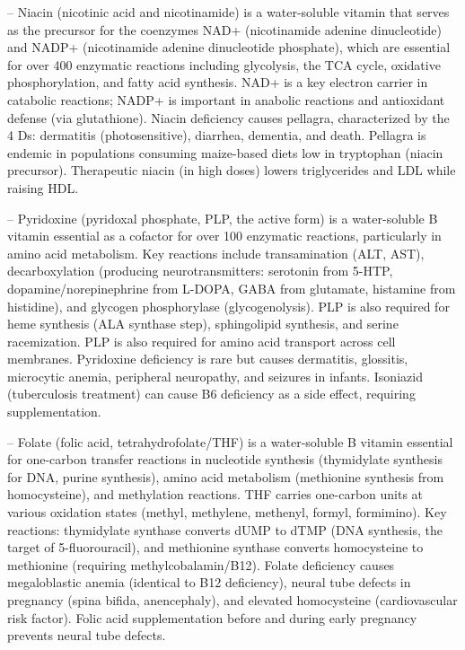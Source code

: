 -- Niacin (nicotinic acid and nicotinamide) is a water-soluble vitamin that serves as the precursor for the coenzymes NAD+ (nicotinamide adenine dinucleotide) and NADP+ (nicotinamide adenine dinucleotide phosphate), which are essential for over 400 enzymatic reactions including glycolysis, the TCA cycle, oxidative phosphorylation, and fatty acid synthesis. NAD+ is a key electron carrier in catabolic reactions; NADP+ is important in anabolic reactions and antioxidant defense (via glutathione). Niacin deficiency causes pellagra, characterized by the 4 Ds: dermatitis (photosensitive), diarrhea, dementia, and death. Pellagra is endemic in populations consuming maize-based diets low in tryptophan (niacin precursor). Therapeutic niacin (in high doses) lowers triglycerides and LDL while raising HDL.

-- Pyridoxine (pyridoxal phosphate, PLP, the active form) is a water-soluble B vitamin essential as a cofactor for over 100 enzymatic reactions, particularly in amino acid metabolism. Key reactions include transamination (ALT, AST), decarboxylation (producing neurotransmitters: serotonin from 5-HTP, dopamine/norepinephrine from L-DOPA, GABA from glutamate, histamine from histidine), and glycogen phosphorylase (glycogenolysis). PLP is also required for heme synthesis (ALA synthase step), sphingolipid synthesis, and serine racemization. PLP is also required for amino acid transport across cell membranes. Pyridoxine deficiency is rare but causes dermatitis, glossitis, microcytic anemia, peripheral neuropathy, and seizures in infants. Isoniazid (tuberculosis treatment) can cause B6 deficiency as a side effect, requiring supplementation.

-- Folate (folic acid, tetrahydrofolate/THF) is a water-soluble B vitamin essential for one-carbon transfer reactions in nucleotide synthesis (thymidylate synthesis for DNA, purine synthesis), amino acid metabolism (methionine synthesis from homocysteine), and methylation reactions. THF carries one-carbon units at various oxidation states (methyl, methylene, methenyl, formyl, formimino). Key reactions: thymidylate synthase converts dUMP to dTMP (DNA synthesis, the target of 5-fluorouracil), and methionine synthase converts homocysteine to methionine (requiring methylcobalamin/B12). Folate deficiency causes megaloblastic anemia (identical to B12 deficiency), neural tube defects in pregnancy (spina bifida, anencephaly), and elevated homocysteine (cardiovascular risk factor). Folic acid supplementation before and during early pregnancy prevents neural tube defects.

